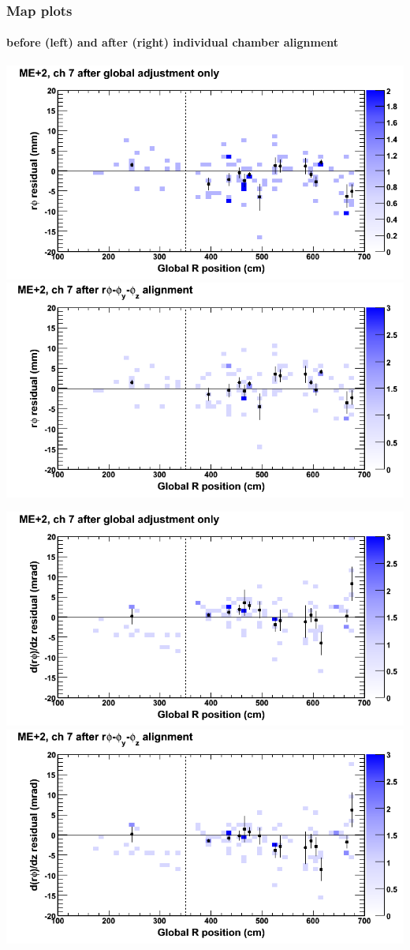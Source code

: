 \documentclass[compress]{beamer}
\begin{document}
\begin{frame}
\frametitle{Map plots}
\framesubtitle{before (left) and after (right) individual chamber alignment}
\includegraphics[width=0.5\linewidth]{ringmapplots_3dof/before_CSCvsr_mep2ch07_x.png} \includegraphics[width=0.5\linewidth]{ringmapplots_3dof/after_CSCvsr_mep2ch07_x.png}

\includegraphics[width=0.5\linewidth]{ringmapplots_3dof/before_CSCvsr_mep2ch07_dxdz.png} \includegraphics[width=0.5\linewidth]{ringmapplots_3dof/after_CSCvsr_mep2ch07_dxdz.png}
\end{frame}
\end{document}
